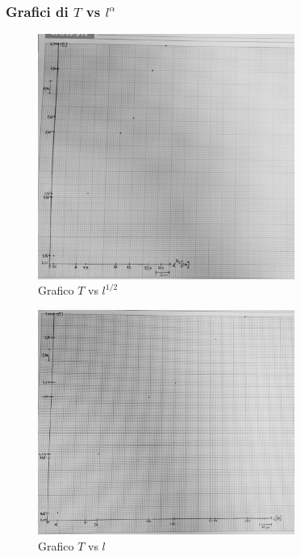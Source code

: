\documentclass[a4paper]{article}
\begin{document}
\subsubsection{Grafici di $T$ vs $l^{\alpha}$}
\begin{figure}[!h]
    \centering
    \includegraphics[width=0.75\textwidth]{fotopendolo/lunghezza12.jpg}
    \caption{Grafico $T$ vs $l^{1/2}$}
\end{figure}
\FloatBarrier
\begin{figure}[!h]
    \centering
    \includegraphics[width=0.75\textwidth]{fotopendolo/lunghezza11.jpg}
    \caption{Grafico $T$ vs $l$}
\end{figure}
\end{document}
